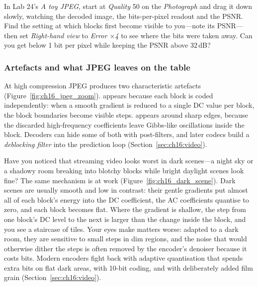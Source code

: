 \begin{tryit}
In Lab 24's \emph{A toy JPEG}, start at \emph{Quality} 50 on the \emph{Photograph} and drag it down
slowly, watching the decoded image, the bits-per-pixel readout and the PSNR. Find the setting at
which blocks first become visible to you---note its PSNR---then set \emph{Right-hand view} to
\emph{Error $\times$4} to see where the bits were taken away. Can you get below 1 bit per pixel
while keeping the PSNR above 32\,dB?
\end{tryit}

\subsubsection{Artefacts and what JPEG leaves on the table}

At high compression JPEG produces two characteristic artefacts (Figure~\ref{fig:ch16_jpeg_zoom}).
 appears because each block is coded independently: when a smooth gradient is
reduced to a single DC value per block, the block boundaries become visible steps. 
appears around sharp edges, because the discarded high-frequency coefficients leave Gibbs-like
oscillations inside the block. Decoders can hide some of both with post-filters, and later codecs
build a \emph{deblocking filter} into the prediction loop (Section~\ref{sec:ch16:video}).


Have you noticed that streaming video looks worst in dark scenes---a night sky or a shadowy room
breaking into blotchy blocks while bright daylight scenes look fine? The same mechanism is at work
(Figure~\ref{fig:ch16_dark_scene}). Dark scenes are usually smooth and low in contrast: their gentle
gradients put almost all of each block's energy into the DC coefficient, the AC coefficients
quantise to zero, and each block becomes flat. Where the gradient is shallow, the step from one
block's DC level to the next is larger than the change inside the block, and you see a staircase of
tiles. Your eyes make matters worse: adapted to a dark room, they are sensitive to small steps in
dim regions, and the noise that would otherwise dither the steps is often removed by the encoder's
denoiser because it costs bits. Modern encoders fight back with adaptive quantisation that spends
extra bits on flat dark areas, with 10-bit coding, and with deliberately added film grain
(Section~\ref{sec:ch16:video}).

